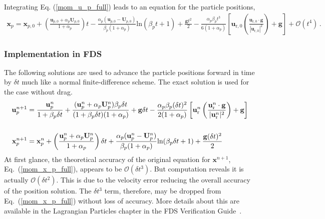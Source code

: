 Integrating Eq. (\ref{mom_u_p_full}) leads to an equation for the particle positions,
\begin{align}
    \label{mom_x_p_full}
    \mathbf{x}_p = \mathbf{x}_{p,0} + \left(\frac{\mathbf{u}_{p,0} + \alpha_p \mathbf{U}_{p,0}}{1 + \alpha_p}\right) t - \frac{\alpha_p (\mathbf{u}_{p,0} - \mathbf{U}_{p,0})}{\beta_p (1 + \alpha_p)} \text{ln}(\beta_p t + 1) + \frac{\mathbf{g} t^2}{2} - \frac{\alpha_p \beta_p t^3}{6 (1 + \alpha_p)} \left[\mathbf{u}_{\text{r},0} \left(\frac{\mathbf{u}_{\text{r},0} \cdot \mathbf{g}}{|\mathbf{u}_{\text{r},0}|^2}\right) + \mathbf{g}\right] + \mathcal{O}(t^4) \,.
\end{align}

\subsubsection*{Implementation in FDS}

The following solutions are used to advance the particle positions forward in time by $\delta t$ much like a normal finite-difference scheme. The exact solution is used for the case without drag.
\begin{align}
    \mathbf{u}_p^{n+1} &= \frac{\mathbf{u}_p^n}{1 + \beta_p \delta t} + \frac{(\mathbf{u}_p^n + \alpha_p \mathbf{U}_p^n)\beta_p \delta t}{(1 + \beta_p \delta t)(1 + \alpha_p)} + \mathbf{g} \delta t - \frac{\alpha_p \beta_p (\delta t)^2}{2 (1 + \alpha_p)} \left[\mathbf{u}_\text{r}^n \left(\frac{\mathbf{u}_\text{r}^n \cdot \mathbf{g}}{|\mathbf{u}_\text{r}^n|^2}\right) + \mathbf{g}\right] \\
    & \notag \\
    \mathbf{x}_p^{n+1} &= \mathbf{x}_p^n + \left(\frac{\mathbf{u}_p^n + \alpha_p \mathbf{U}_p^n}{1 + \alpha_p}\right) \delta t + \frac{\alpha_p (\mathbf{u}_p^n - \mathbf{U}_p^n)}{\beta_p (1 + \alpha_p)} \text{ln}(\beta_p \delta t + 1) + \frac{\mathbf{g} (\delta t)^2}{2}
\end{align}
At first glance, the theoretical accuracy of the original equation for $\mathbf{x}^{n+1}$, Eq.~(\ref{mom_x_p_full}), appears to be $\mathcal{O}(\delta t^3)$. But computation reveals it is actually $\mathcal{O}(\delta t^2)$. This is due to the velocity error reducing the overall accuracy of the position solution. The $\delta t^3$ term, therefore, may be dropped from Eq.~(\ref{mom_x_p_full}) without loss of accuracy. More details about this are available in the Lagrangian Particles chapter in the FDS Verification Guide~\cite{FDS_Verification_Guide}.



